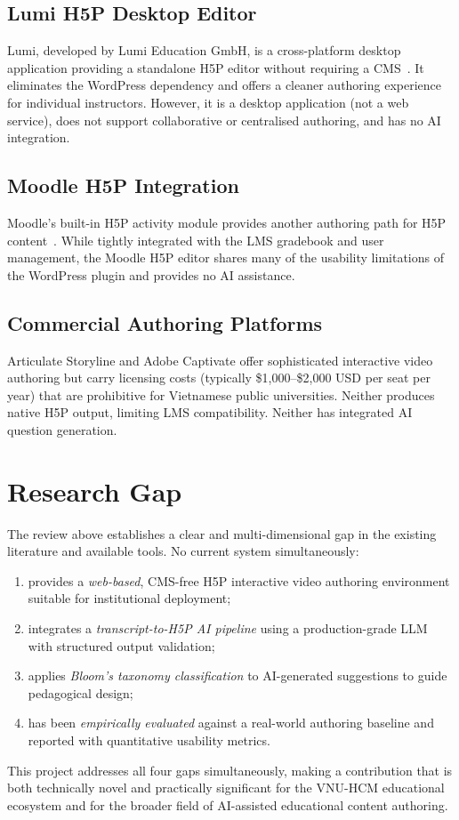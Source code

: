 \subsection{Lumi H5P Desktop Editor}

Lumi, developed by Lumi Education GmbH, is a cross-platform desktop
application providing a standalone H5P editor without requiring a
CMS~\cite{lumieducation2023}. It eliminates the WordPress dependency and
offers a cleaner authoring experience for individual instructors. However,
it is a desktop application (not a web service), does not support
collaborative or centralised authoring, and has no AI integration.

\subsection{Moodle H5P Integration}

Moodle's built-in H5P activity module provides another authoring path for
H5P content~\cite{moodle2023}. While tightly integrated with the LMS
gradebook and user management, the Moodle H5P editor shares many of the
usability limitations of the WordPress plugin and provides no AI assistance.

\subsection{Commercial Authoring Platforms}

Articulate Storyline and Adobe Captivate offer sophisticated interactive
video authoring but carry licensing costs (typically \$1{,}000--\$2{,}000
USD per seat per year) that are prohibitive for Vietnamese public
universities. Neither produces native H5P output, limiting LMS
compatibility. Neither has integrated AI question generation.

\section{Research Gap}

The review above establishes a clear and multi-dimensional gap in the
existing literature and available tools. No current system simultaneously:

\begin{enumerate}
  \item provides a \emph{web-based}, CMS-free H5P interactive video
  authoring environment suitable for institutional deployment;
  \item integrates a \emph{transcript-to-H5P AI pipeline} using a
  production-grade LLM with structured output validation;
  \item applies \emph{Bloom's taxonomy classification} to AI-generated
  suggestions to guide pedagogical design;
  \item has been \emph{empirically evaluated} against a real-world authoring
  baseline and reported with quantitative usability metrics.
\end{enumerate}

This project addresses all four gaps simultaneously, making a contribution
that is both technically novel and practically significant for the VNU-HCM
educational ecosystem and for the broader field of AI-assisted educational
content authoring.
